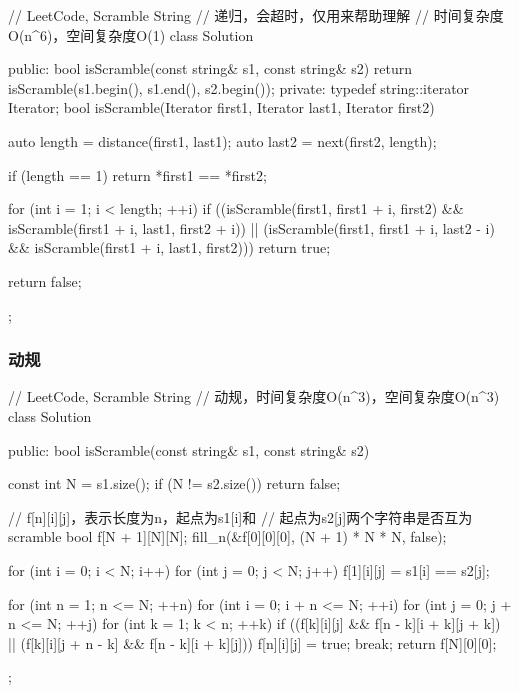 \begin{Code}
// LeetCode, Scramble String
// 递归，会超时，仅用来帮助理解
// 时间复杂度O(n^6)，空间复杂度O(1)
class Solution {
public:
    bool isScramble(const string& s1, const string& s2) {
        return isScramble(s1.begin(), s1.end(), s2.begin());
    }
private:
    typedef string::iterator Iterator;
    bool isScramble(Iterator first1, Iterator last1, Iterator first2) {
        auto length = distance(first1, last1);
        auto last2 = next(first2, length);

        if (length == 1) return *first1 == *first2;

        for (int i = 1; i < length; ++i)
            if ((isScramble(first1, first1 + i, first2)
                 && isScramble(first1 + i, last1, first2 + i))
                    || (isScramble(first1, first1 + i, last2 - i)
                            && isScramble(first1 + i, last1, first2)))
                return true;

        return false;
    }
};
\end{Code}


\subsubsection{动规}
\begin{Code}
// LeetCode, Scramble String
// 动规，时间复杂度O(n^3)，空间复杂度O(n^3)
class Solution {
public:
    bool isScramble(const string& s1, const string& s2) {
        const int N = s1.size();
        if (N != s2.size()) return false;

        // f[n][i][j]，表示长度为n，起点为s1[i]和
        // 起点为s2[j]两个字符串是否互为scramble
        bool f[N + 1][N][N];
        fill_n(&f[0][0][0], (N + 1) * N * N, false);

        for (int i = 0; i < N; i++)
            for (int j = 0; j < N; j++)
                f[1][i][j] = s1[i] == s2[j];

        for (int n = 1; n <= N; ++n) {
            for (int i = 0; i + n <= N; ++i) {
                for (int j = 0; j + n <= N; ++j) {
                    for (int k = 1; k < n; ++k) {
                        if ((f[k][i][j] && f[n - k][i + k][j + k]) ||
                                (f[k][i][j + n - k] && f[n - k][i + k][j])) {
                            f[n][i][j] = true;
                            break;
                        }
                    }
                }
            }
        }
        return f[N][0][0];
    }
};
\end{Code}


